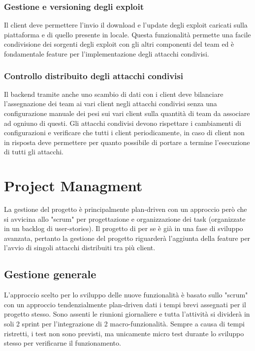 \documentclass[11pt]{article}
\begin{document}
\subsubsection{Gestione e versioning degli exploit}
Il client deve permettere l'invio il download e l'update degli exploit caricati sulla piattaforma e di quello presente in locale. Questa funzionalità permette una facile condivisione dei sorgenti degli exploit con gli altri componenti del team ed è fondamentale feature per l'implementazione degli attacchi condivisi.
\subsubsection{Controllo distribuito degli attacchi condivisi}
Il backend tramite anche uno scambio di dati con i client deve bilanciare l'assegnazione dei team ai vari client negli attacchi condivisi senza una configurazione manuale dei pesi sui vari client sulla quantità di team da associare ad ogniuno di questi. Gli attacchi condivisi devono rispettare i cambiamenti di configurazioni e verificare che tutti i client periodicamente, in caso di client non in risposta deve permettere per quanto possibile di portare a termine l'esecuzione di tutti gli attacchi.
\section{Project Managment}
La gestione del progetto è principalmente plan-driven con un approccio però che si avvicina allo "scrum" per progettazione e organizzazione dei task (organizzate in un backlog di user-stories). Il progetto di per se è già in una fase di sviluppo avanzata, pertanto la gestione del progetto riguarderà l'aggiunta della feature per l'avvio di singoli attacchi distribuiti tra più client.
\subsection{Gestione generale}
L'approccio scelto per lo sviluppo delle nuove funzionalità è basato sullo "scrum" con un approccio tendenzialmente plan-driven dati i tempi brevi assegnati per il progetto stesso. Sono assenti le riunioni giornaliere e tutta l'attività si dividerà in soli 2 sprint per l'integrazione di 2 macro-funzionalità.
Sempre a causa di tempi ristretti, i test non sono previsti, ma unicamente micro test durante lo sviluppo stesso per verificarne il funzionamento.
\end{document}
